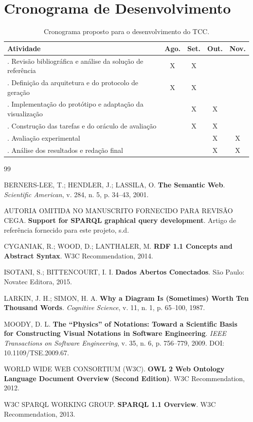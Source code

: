 \documentclass[10pt,a4paper]{article}
\begin{document}
\section{Cronograma de Desenvolvimento}

\begin{table}[ht]
    \centering
    \small
    \renewcommand{\arraystretch}{1.25}
    \begin{tabularx}{\textwidth}{>{\RaggedRight\arraybackslash}X c c c c}
        \toprule
        \textbf{Atividade} & \textbf{Ago.} & \textbf{Set.} & \textbf{Out.} & \textbf{Nov.} \\
        \midrule
        1. Revisão bibliográfica e análise da solução de referência & X & X &  &  \\
        2. Definição da arquitetura e do protocolo de geração & X & X &  &  \\
        3. Implementação do protótipo e adaptação da visualização &  & X & X &  \\
        4. Construção das tarefas e do oráculo de avaliação &  & X & X &  \\
        5. Avaliação experimental &  &  & X & X \\
        6. Análise dos resultados e redação final &  &  & X & X \\
        \bottomrule
    \end{tabularx}
    \caption{Cronograma proposto para o desenvolvimento do TCC.}
\end{table}

\begin{thebibliography}{99}

BERNERS-LEE, T.; HENDLER, J.; LASSILA, O.
\textbf{The Semantic Web}.
\textit{Scientific American}, v. 284, n. 5, p. 34--43, 2001.

AUTORIA OMITIDA NO MANUSCRITO FORNECIDO PARA REVISÃO CEGA.
\textbf{Support for SPARQL graphical query development}.
Artigo de referência fornecido para este projeto, s.d.

CYGANIAK, R.; WOOD, D.; LANTHALER, M.
\textbf{RDF 1.1 Concepts and Abstract Syntax}.
W3C Recommendation, 2014.

ISOTANI, S.; BITTENCOURT, I. I.
\textbf{Dados Abertos Conectados}.
São Paulo: Novatec Editora, 2015.

LARKIN, J. H.; SIMON, H. A.
\textbf{Why a Diagram Is (Sometimes) Worth Ten Thousand Words}.
\textit{Cognitive Science}, v. 11, n. 1, p. 65--100, 1987.

MOODY, D. L.
\textbf{The ``Physics'' of Notations: Toward a Scientific Basis for Constructing Visual Notations in Software Engineering}.
\textit{IEEE Transactions on Software Engineering}, v. 35, n. 6, p. 756--779, 2009. DOI: 10.1109/TSE.2009.67.

WORLD WIDE WEB CONSORTIUM (W3C).
\textbf{OWL 2 Web Ontology Language Document Overview (Second Edition)}.
W3C Recommendation, 2012.

W3C SPARQL WORKING GROUP.
\textbf{SPARQL 1.1 Overview}.
W3C Recommendation, 2013.

\end{thebibliography}
\end{document}
